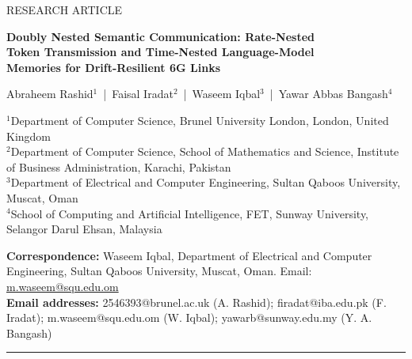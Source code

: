 \begin{center}
{\sffamily\small RESEARCH ARTICLE}\\[6pt]
{\sffamily\bfseries\LARGE Doubly Nested Semantic Communication: Rate-Nested\\[2pt] Token Transmission and Time-Nested Language-Model\\[2pt] Memories for Drift-Resilient 6G Links\par}
\vspace{10pt}
{\normalsize Abraheem Rashid$^{1}$ \,|\, Faisal Iradat$^{2}$ \,|\, Waseem Iqbal$^{3}$ \,|\, Yawar Abbas Bangash$^{4}$\par}
\vspace{6pt}
{\footnotesize
$^{1}$Department of Computer Science, Brunel University London, London, United Kingdom\\
$^{2}$Department of Computer Science, School of Mathematics and Science, Institute of Business Administration, Karachi, Pakistan\\
$^{3}$Department of Electrical and Computer Engineering, Sultan Qaboos University, Muscat, Oman\\
$^{4}$School of Computing and Artificial Intelligence, FET, Sunway University, Selangor Darul Ehsan, Malaysia\par}
\vspace{6pt}
{\footnotesize
\textbf{Correspondence:} Waseem Iqbal, Department of Electrical and Computer Engineering, Sultan Qaboos University, Muscat, Oman. Email: \href{mailto:m.waseem@squ.edu.om}{m.waseem@squ.edu.om}\\[2pt]
\textbf{Email addresses:} 2546393@brunel.ac.uk (A. Rashid); firadat@iba.edu.pk (F. Iradat); m.waseem@squ.edu.om (W. Iqbal); yawarb@sunway.edu.my (Y. A. Bangash)\par}
\end{center}

\vspace{6pt}
\noindent\rule{\textwidth}{0.4pt}

